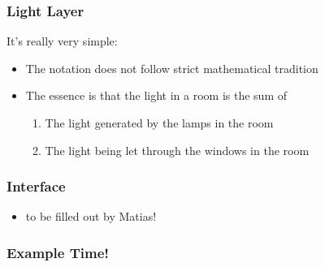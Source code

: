 \documentclass[t]{beamer}
\begin{document}
\begin{frame}
  \frametitle{Light Layer}
  
  It's really very simple:
  \begin{center}
  \end{center}
  \begin{itemize}
    \pause
    \item The notation does not follow strict mathematical tradition
    \pause
    \item The essence is that the light in a room is the sum of
    \begin{enumerate}
      \item The light generated by the lamps in the room
      \item The light being let through the windows in the room
    \end{enumerate}
  \end{itemize}
  
\end{frame}

\begin{frame}
  \frametitle{Interface}
  
  \begin{itemize}
    \item to be filled out by Matias!
  \end{itemize}
  
\end{frame}

\begin{frame}
  \frametitle{Example Time!}
  
\end{frame}
\end{document}
